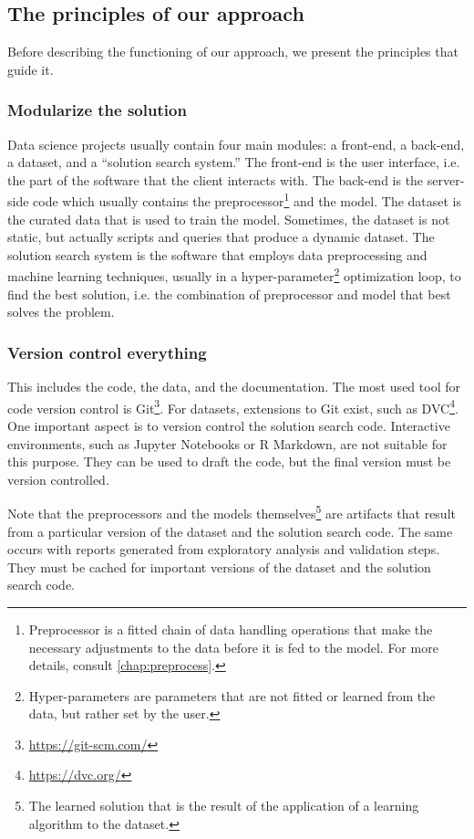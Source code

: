 \subsection{The principles of our approach}

Before describing the functioning of our approach, we present the principles that guide it.

\subsubsection{Modularize the solution}

Data science projects usually contain four main modules: a front-end, a back-end, a
dataset, and a ``solution search system.''  The front-end is the user interface, i.e.
the part of the software that the client interacts with.  The back-end is the server-side
code which usually contains the preprocessor\footnote{Preprocessor is a fitted chain of
data handling operations that make the necessary adjustments to the data before it is
fed to the model.  For more details, consult \cref{chap:preprocess}.} and the model.
The dataset is the curated data that is used to train the
model.  Sometimes, the dataset is not static, but actually scripts and queries that
produce a dynamic dataset.  The solution search system is the software that employs data
preprocessing and machine learning techniques, usually in a
hyper-parameter\footnote{Hyper-parameters are parameters that are not fitted or learned
from the data, but rather set by the user.} optimization loop,
to find the best solution, i.e. the combination of preprocessor and model that best
solves the problem.

\subsubsection{Version control everything}

This includes the code, the data, and the
documentation. The most used tool for code version control is
Git\footnote{\url{https://git-scm.com/}}.  For datasets,
extensions to Git exist, such as DVC\footnote{\url{https://dvc.org/}}.  One important aspect
is to version control the solution search code.  Interactive environments, such as Jupyter
Notebooks or R Markdown, are not suitable for this purpose.  They can be used to draft the code, but
the final version must be version controlled.

Note that the preprocessors and the models themselves\footnote{The learned
solution that is the result of the application of a learning algorithm to the dataset.} are
artifacts that result from a particular version of the dataset and the solution search
code.  The same occurs with reports generated from exploratory analysis and validation
steps.  They must be cached for important versions of the dataset and the solution search
code.

